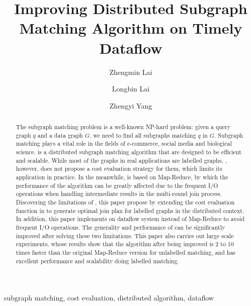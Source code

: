 \documentclass[conference]{IEEEtran}
\begin{document}
\title{Improving Distributed Subgraph Matching Algorithm on Timely Dataflow}

\author[1]{Zhengmin Lai}
\author[2]{Longbin Lai}
\author[2]{Zhengyi Yang}

\maketitle

\begin{abstract}
The subgraph matching problem is a well-known NP-hard problem: given a query graph $q$ and a data graph $G$, we need to find all subgraphs matching $q$ in $G$. Subgraph matching plays a vital role in the fields of e-commerce, social media and biological science. \cliquejoin is a distributed subgraph matching algorithm that are designed to be efficient and scalable. While most of the graphs in real applications are labelled graphs, \cliquejoin, however, does not propose a cost evaluation strategy for them, which limits its application in practice. In the meanwhile, \cliquejoin is based on Map-Reduce, by which the performance of the algorithm can be greatly affected due to the frequent I/O operations when handling intermediate results in the multi-round join process. Discovering the limitations of \cliquejoin, this paper propose \gencliqjoin by extending the cost evaluation function in \cliquejoin to generate optimal join plan for labelled graphs in the distributed context. In addition, this paper implements \gencliqjoin on \timely dataflow system instead of Map-Reduce to avoid frequent I/O operations. The generality and performance of \cliquejoin can be significantly improved after solving these two limitations. This paper also carries out large scale experiments, whose results show that the algorithm after being improved is 2 to 10 times faster than the original Map-Reduce version for unlabelled matching, and has excellent performance and scalability doing labelled matching.
\end{abstract}

\begin{IEEEkeywords}
 subgraph matching, cost evaluation, distributed algorithm, dataflow
\end{IEEEkeywords}















\end{document}
